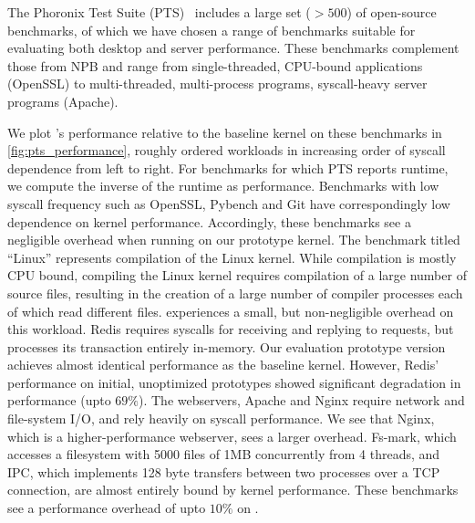 \documentclass[letterpaper,twocolumn,10pt, anonymous]{article}
\begin{document}
The Phoronix Test Suite (PTS)~\cite{pts} includes a large set ($>500$) of 
open-source benchmarks, of which we have chosen a range of benchmarks 
suitable for evaluating both desktop and server performance.
These benchmarks complement those from NPB and range from single-threaded, 
CPU-bound applications (OpenSSL) to multi-threaded, multi-process 
programs, syscall-heavy server programs (Apache).

We plot \tiktok's performance relative to the baseline kernel on
these benchmarks in \autoref{fig:pts_performance}, roughly ordered 
workloads in increasing order of syscall dependence from left to right.
For benchmarks for which PTS reports runtime, we compute the inverse 
of the runtime as performance.
Benchmarks with low syscall frequency such as OpenSSL, 
Pybench and Git have correspondingly low dependence on kernel performance.
Accordingly, these benchmarks see a negligible overhead when running 
on our prototype kernel.
The benchmark titled ``Linux'' represents compilation of the Linux kernel.
While compilation is mostly CPU bound, compiling the Linux kernel requires 
compilation of a large number of source files, resulting in the creation 
of a large number of compiler processes each of which read different files. 
\tiktok experiences a small, but non-negligible overhead on this workload.
Redis requires syscalls for receiving and replying to requests, but 
processes its transaction entirely in-memory. 
Our evaluation prototype version achieves almost identical performance
as the baseline kernel.
However, Redis' performance on initial, unoptimized prototypes showed
significant degradation in performance (upto $69\%$).
The webservers, Apache and Nginx require network and file-system I/O, 
and rely heavily on syscall performance. 
We see that Nginx, which is a higher-performance webserver, sees a larger
overhead.
Fs-mark, which accesses a filesystem with 5000 files of 1MB concurrently
from 4 threads, and IPC, which implements 128 byte transfers between 
two processes over a TCP connection, are almost entirely bound by kernel 
performance. 
These benchmarks see a performance overhead of upto $10\%$ on \tiktok.
\end{document}
